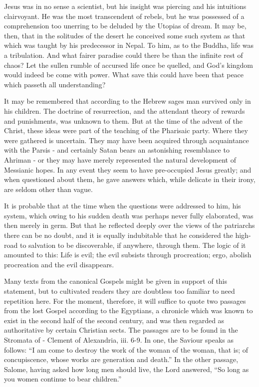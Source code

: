 \documentclass[]{book}
\begin{document}
Jesus was in no sense a scientist, but his insight was piercing and his
intuitions clairvoyant. He was the most transcendent of rebels, but he
was possessed of a comprehension too unerring to be deluded by the
Utopias of dream. It may be, then, that in the solitudes of the desert
he conceived some such system as that which was taught by his
predecessor in Nepal. To him, as to the Buddha, life was a tribulation.
And what fairer paradise could there be than the infinite rest of chaos?
Let the sullen rumble of accursed life once be quelled, and God's
kingdom would indeed be come with power. What save this could have been
that peace which passeth all understanding?

It may be remembered that according to the Hebrew sages man survived
only in his children. The doctrine of resurrection, and the attendant
theory of rewards and punishments, was unknown to them. But at the time
of the advent of the Christ, these ideas were part of the teaching of
the Pharisaic party. Where they were gathered is uncertain. They may
have been acquired through acquaintance with the Parsis - and certainly
Satan bears an astonishing resemblance to Ahriman - or they may have
merely represented the natural development of Messianic hopes. In any
event they seem to have pre-occupied Jesus greatly; and when questioned
about them, he gave answers which, while delicate in their irony, are
seldom other than vague.

It is probable that at the time when the questions were addressed to
him, his system, which owing to his sudden death was perhaps never fully
elaborated, was then merely in germ. But that he reflected deeply over
the views of the patriarchs there can be no doubt, and it is equally
indubitable that he considered the high-road to salvation to be
discoverable, if anywhere, through them. The logic of it amounted to
this: Life is evil; the evil subsists through procreation; ergo, abolish
procreation and the evil disappears.

Many texts from the canonical Gospels might be given in support of this
statement, but to cultivated readers they are doubtless too familiar to
need repetition here. For the moment, therefore, it will suffice to
quote two passages from the lost Gospel according to the Egyptians, a
chronicle which was known to exist in the second half of the second
century, and was then regarded as authoritative by certain Christian
sects. The passages are to be found in the Stromata of - Clement of
Alexandria, iii. 6-9. In one, the Saviour speaks as follows: ``I am come
to destroy the work of the woman of the woman, that is; of
concupiscence, whose works are generation and death.'' In the other
passage, Salome, having asked how long men should live, the Lord
answered, ``So long as you women continue to bear children.''
\end{document}

